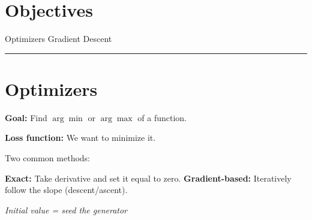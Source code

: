 \section*{Objectives}
\begin{outline}
    \1 Optimizers
    \1 Gradient Descent
\end{outline}

\rule[0.5ex]{\textwidth}{0.5pt}

\section*{Optimizers}

\textbf{Goal:} Find $\arg\min$ or $\arg\max$ of a function.

\textbf{Loss function:} We want to minimize it.

Two common methods:
\begin{outline}
    \1 \textbf{Exact:} Take derivative and set it equal to zero.
    \1 \textbf{Gradient-based:} Iteratively follow the slope (descent/ascent).
\end{outline}

\begin{center}
    \textit{Initial value = seed the generator}
\end{center}

